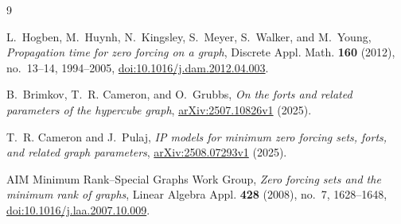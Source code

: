 \documentclass[11pt]{amsart}
\theoremstyle{remark}
\begin{document}
\begin{thebibliography}{9}

L.~Hogben, M.~Huynh, N.~Kingsley, S.~Meyer, S.~Walker, and M.~Young,
\emph{Propagation time for zero forcing on a graph},
Discrete Appl. Math. \textbf{160} (2012), no.~13--14, 1994--2005,
\href{https://doi.org/10.1016/j.dam.2012.04.003}
{doi:10.1016/j.dam.2012.04.003}.

B.~Brimkov, T.~R. Cameron, and O.~Grubbs,
\emph{On the forts and related parameters of the hypercube graph},
\href{https://arxiv.org/abs/2507.10826}{arXiv:2507.10826v1} (2025).

T.~R. Cameron and J.~Pulaj,
\emph{IP models for minimum zero forcing sets, forts, and related graph
parameters},
\href{https://arxiv.org/abs/2508.07293}{arXiv:2508.07293v1} (2025).

AIM Minimum Rank--Special Graphs Work Group,
\emph{Zero forcing sets and the minimum rank of graphs},
Linear Algebra Appl. \textbf{428} (2008), no.~7, 1628--1648,
\href{https://doi.org/10.1016/j.laa.2007.10.009}
{doi:10.1016/j.laa.2007.10.009}.

\end{thebibliography}
\end{document}

